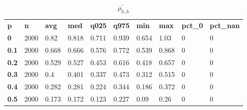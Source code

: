 \begin{table}[h]
 \centering 
\footnotesize
\caption{$\rho_{h,h}^\prime $}
\label{tab:alphahh}
\begin{tabular}[h]{| l l l l l l l l l l|
    } \hline
\textbf{ p} & \textbf{ n} & \textbf{ avg} & \textbf{ med} & \textbf{ q025} & \textbf{ q975} & \textbf{ min} & \textbf{ max} & \textbf{ pct\_0} & \textbf{ pct\_nan}
           \\
  \textbf{  0} & 2000 &  0.82 & 0.818 & 0.711 & 0.939 & 0.654 &  1.03 & 0 & 0
           \\
  \textbf{0.1} & 2000 & 0.668 & 0.666 & 0.576 & 0.772 & 0.539 & 0.868 & 0 & 0
           \\
  \textbf{0.2} & 2000 & 0.529 & 0.527 & 0.453 & 0.616 & 0.418 & 0.657 & 0 & 0
           \\
  \textbf{0.3} & 2000 &   0.4 & 0.401 & 0.337 & 0.473 & 0.312 & 0.515 & 0 & 0
           \\
  \textbf{0.4} & 2000 & 0.282 & 0.281 & 0.224 & 0.344 & 0.186 & 0.372 & 0 & 0
           \\
  \textbf{0.5} & 2000 & 0.173 & 0.172 & 0.123 & 0.227 &  0.09 &  0.26 & 0 & 0
           \\
 \hline \end{tabular}
 \end{table}
